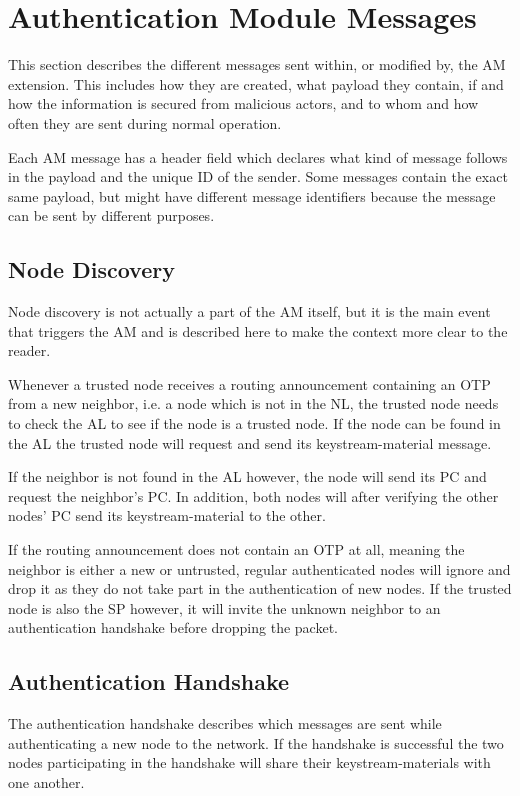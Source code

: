\section{Authentication Module Messages}
\label{sect:am_messages}
This section describes the different messages sent within, or modified by, the
\ac{AM} extension. This includes how they are created, what payload they
contain, if and how the information is secured from malicious actors, and to
whom and how often they are sent during normal operation.

Each \ac{AM} message has a header field which declares what kind of message
follows in the payload and the unique ID of the sender. Some messages contain
the exact same payload, but might have different message identifiers because the
message can be sent by different purposes.

\subsection{Node Discovery}
Node discovery is not actually a part of the \ac{AM} itself, but it is the
main event that triggers the \ac{AM} and is described here to make the context
more clear to the reader.

Whenever a trusted node receives a routing announcement containing an \acf{OTP}
from a new neighbor, i.e. a node which is not in the \acf{NL}, the trusted node
needs to check the \acf{AL} to see if the node is a trusted node. If the node
can be found in the \ac{AL} the trusted node will request and send its
keystream-material message.

If the neighbor is not found in the \ac{AL} however, the node will send its
\ac{PC} and request the neighbor's \ac{PC}. In addition, both nodes will after
verifying the other nodes' \ac{PC} send its keystream-material to the other.

If the routing announcement does not contain an \ac{OTP} at all, meaning the
neighbor is either a new or untrusted, regular authenticated nodes will ignore
and drop it as they do not take part in the authentication of new nodes. If the
trusted node is also the \acf{SP} however, it will invite the unknown neighbor
to an authentication handshake before dropping the packet.

\subsection{Authentication Handshake}
The authentication handshake describes which messages are sent while
authenticating a new node to the network. If the handshake is successful the two
nodes participating in the handshake will share their keystream-materials with
one another.

